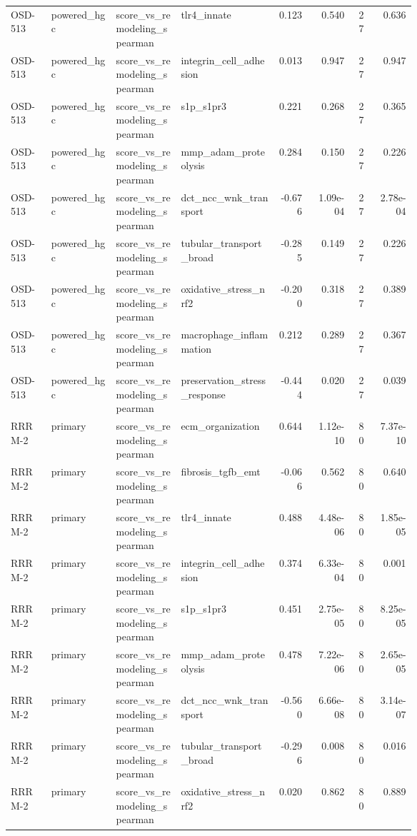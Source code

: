 \documentclass[11pt]{article}
\begin{document}
\begin{landscape}
\begin{longtable}{p{0.10\linewidth}p{0.16\linewidth}p{0.16\linewidth}p{0.24\linewidth}rrrr}
OSD-513 & powered\_hgc & score\_vs\_remodeling\_spearman & tlr4\_innate & 0.123 & 0.540 & 27 & 0.636 \\
OSD-513 & powered\_hgc & score\_vs\_remodeling\_spearman & integrin\_cell\_adhesion & 0.013 & 0.947 & 27 & 0.947 \\
OSD-513 & powered\_hgc & score\_vs\_remodeling\_spearman & s1p\_s1pr3 & 0.221 & 0.268 & 27 & 0.365 \\
OSD-513 & powered\_hgc & score\_vs\_remodeling\_spearman & mmp\_adam\_proteolysis & 0.284 & 0.150 & 27 & 0.226 \\
OSD-513 & powered\_hgc & score\_vs\_remodeling\_spearman & dct\_ncc\_wnk\_transport & -0.676 & 1.09e-04 & 27 & 2.78e-04 \\
OSD-513 & powered\_hgc & score\_vs\_remodeling\_spearman & tubular\_transport\_broad & -0.285 & 0.149 & 27 & 0.226 \\
OSD-513 & powered\_hgc & score\_vs\_remodeling\_spearman & oxidative\_stress\_nrf2 & -0.200 & 0.318 & 27 & 0.389 \\
OSD-513 & powered\_hgc & score\_vs\_remodeling\_spearman & macrophage\_inflammation & 0.212 & 0.289 & 27 & 0.367 \\
OSD-513 & powered\_hgc & score\_vs\_remodeling\_spearman & preservation\_stress\_response & -0.444 & 0.020 & 27 & 0.039 \\
RRRM-2 & primary & score\_vs\_remodeling\_spearman & ecm\_organization & 0.644 & 1.12e-10 & 80 & 7.37e-10 \\
RRRM-2 & primary & score\_vs\_remodeling\_spearman & fibrosis\_tgfb\_emt & -0.066 & 0.562 & 80 & 0.640 \\
RRRM-2 & primary & score\_vs\_remodeling\_spearman & tlr4\_innate & 0.488 & 4.48e-06 & 80 & 1.85e-05 \\
RRRM-2 & primary & score\_vs\_remodeling\_spearman & integrin\_cell\_adhesion & 0.374 & 6.33e-04 & 80 & 0.001 \\
RRRM-2 & primary & score\_vs\_remodeling\_spearman & s1p\_s1pr3 & 0.451 & 2.75e-05 & 80 & 8.25e-05 \\
RRRM-2 & primary & score\_vs\_remodeling\_spearman & mmp\_adam\_proteolysis & 0.478 & 7.22e-06 & 80 & 2.65e-05 \\
RRRM-2 & primary & score\_vs\_remodeling\_spearman & dct\_ncc\_wnk\_transport & -0.560 & 6.66e-08 & 80 & 3.14e-07 \\
RRRM-2 & primary & score\_vs\_remodeling\_spearman & tubular\_transport\_broad & -0.296 & 0.008 & 80 & 0.016 \\
RRRM-2 & primary & score\_vs\_remodeling\_spearman & oxidative\_stress\_nrf2 & 0.020 & 0.862 & 80 & 0.889 \\

\end{longtable}
\end{landscape}
\end{document}
